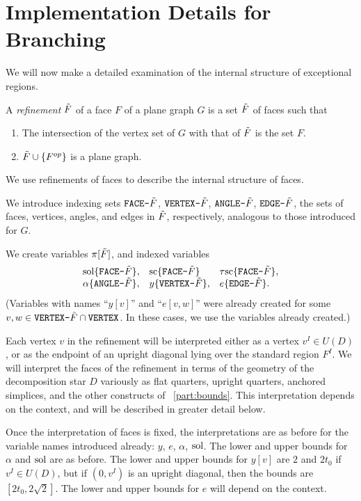 
\section{Implementation Details for Branching}
\label{sec:facerefinement}

We will now make a detailed examination of the internal structure
of exceptional regions.

A {\it refinement\/} ${\hbox{$\tilde F$}}$ of a face $F$ of a plane graph $G$
is a set ${\hbox{$\tilde F$}}$ of faces  such that
    \begin{enumerate}
    \item The intersection of
the vertex set of $G$ with that of ${\hbox{$\tilde F$}}$ is the set $F$.
    \item ${\hbox{$\tilde F$}} \cup\{F^{op}\}$ is a plane graph.
    \end{enumerate}
We use refinements of faces to describe the internal structure of
faces.

We introduce indexing sets $\hbox{\tt FACE-{\hbox{$\tilde F$}}}$,
$\hbox{\tt VERTEX-{\hbox{$\tilde F$}}}$, $\hbox{\tt ANGLE-{\hbox{$\tilde F$}}}$,
$\hbox{\tt EDGE-{\hbox{$\tilde F$}}}$, the sets of faces, vertices, angles, and
edges in ${\hbox{$\tilde F$}}$, respectively, analogous to those introduced
for $G$.

We create variables
    $\pi[{\hbox{$\tilde F$}}]$, and indexed variables
    $$
    \begin{array}{lll}
    \operatorname{sol}\{\hbox{\tt FACE-{\hbox{$\tilde F$}}}\}, & {\operatorname{sc}}\{\hbox{\tt FACE-{\hbox{$\tilde F$}}}\} &
    {\tau\!\operatorname{sc}}\{\hbox{\tt FACE-{\hbox{$\tilde F$}}}\},\\
    \alpha\{\hbox{\tt ANGLE-{\hbox{$\tilde F$}}}\}, & y\{\hbox{\tt VERTEX-{\hbox{$\tilde F$}}}\}, &
    e\{\hbox{\tt EDGE-{\hbox{$\tilde F$}}}\}.
    \end{array}
    $$
(Variables with names ``$y[v]$'' and ``$e[v,w]$'' were already
created for some $v,w\in \hbox{\tt VERTEX-{\hbox{$\tilde F$}}}\cap
\hbox{\tt VERTEX}$.  In these cases, we use the variables already
created.)

Each vertex $v$ in the refinement will be interpreted either as a
vertex $v^I\in U(D)$, or as the endpoint of an upright diagonal
lying over the standard region $F^I$. We will interpret the faces
of the refinement in terms of the geometry of the decomposition
star $D$ variously as flat quarters, upright quarters, anchored
simplices, and the other constructs of \Part~\ref{part:bounds}.
This interpretation depends on the context, and will be described
in greater detail below.

Once the interpretation of faces is fixed, the interpretations are
as before for the variable names introduced already: $y$, $e$,
$\alpha$, $\operatorname{sol}$.  The lower and upper bounds for $\alpha$ and
$\operatorname{sol}$ are as before.  The lower and upper bounds for $y[v]$ are
$2$ and $2t_0$ if $v^I\in U(D)$, but if $(0,v^I)$ is an upright
diagonal, then the bounds are $[2t_0,2\sqrt2]$. The lower and
upper bounds for $e$ will depend on the context.

